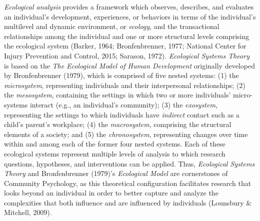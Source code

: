 \documentclass[11pt,]{tufte-book}
\begin{document}
\emph{Ecological analysis} provides a framework which observes,
describes, and evaluates an individual's development, experiences, or
behaviors in terms of the individual's multilevel and dynamic
environment, or \emph{ecology}, and the transactional relationships
among the individual and one or more structural levels comprising the
ecological system (Barker, 1964; Bronfenbrenner, 1977; National Center
for Injury Prevention and Control, 2015; Sarason, 1972).
\emph{Ecological Systems Theory} is based on the \emph{The Ecological
Model of Human Development} originally developed by Bronfenbrenner
(1979), which is comprised of five nested systems: (1) the
\emph{microsystem}, representing individuals and their interpersonal
relationships; (2) the \emph{mesosystem}, containing the settings in
which two or more individuals' micro-systems interact (e.g., an
individual's community); (3) the \emph{exosystem}, representing the
settings to which individuals have \emph{indirect} contact such as a
child's parent's workplace; (4) the \emph{macrosystem}, comprising the
structural elements of a society; and (5) the \emph{chronosystem},
representing changes over time within and among each of the former four
nested systems. Each of these ecological systems represent multiple
levels of analysis to which research questions, hypotheses, and
interventions can be applied. Thus, \emph{Ecological Systems Theory} and
Bronfenbrenner (1979)'s \emph{Ecological Model} are cornerstones of
Community Psychology, as this theoretical configuration facilitates
research that looks beyond an individual in order to better capture and
analyze the complexities that both influence and are influenced by
individuals (Lounsbury \& Mitchell, 2009).
\end{document}
